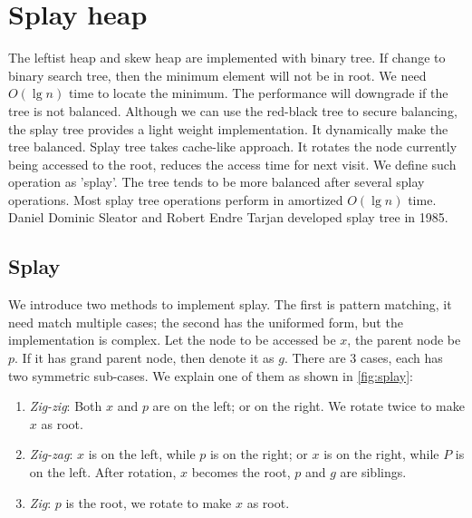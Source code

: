 \documentclass[b5paper]{article}
\begin{document}
\section{Splay heap}
\label{splayheap} 

The leftist heap and skew heap are implemented with binary tree. If change to binary search tree, then the minimum element will not be in root. We need $O(\lg n)$ time to locate the minimum. The performance will downgrade if the tree is not balanced. Although we can use the red-black tree to secure balancing, the splay tree provides a light weight implementation. It dynamically make the tree balanced. Splay tree takes cache-like approach. It rotates the node currently being accessed to the root, reduces the access time for next visit. We define such operation as 'splay'. The tree tends to be more balanced after several splay operations. Most splay tree operations perform in amortized $O(\lg n)$ time. Daniel Dominic Sleator and Robert Endre Tarjan developed splay tree in 1985\cite{wiki-splay-tree}\cite{self-adjusting-trees}.

\subsection{Splay}

We introduce two methods to implement splay. The first is pattern matching, it need match multiple cases; the second has the uniformed form, but the implementation is complex. Let the node to be accessed be $x$, the parent node be $p$. If it has grand parent node, then denote it as $g$. There are 3 cases, each has two symmetric sub-cases. We explain one of them as shown in \cref{fig:splay}:

\begin{enumerate}
\item {\em Zig-zig}: Both $x$ and $p$ are on the left; or on the right. We rotate twice to make $x$ as root.

\item {\em Zig-zag}: $x$ is on the left, while $p$ is on the right; or $x$ is on the right, while $P$ is on the left. After rotation, $x$ becomes the root, $p$ and $g$ are siblings.

\item {\em Zig}: $p$ is the root, we rotate to make $x$ as root.
\end{enumerate}
\end{document}
